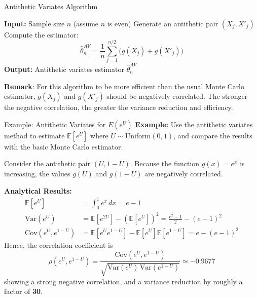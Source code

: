 \documentclass[8pt]{beamer}
\begin{document}
\begin{frame}{Antithetic Variates Algorithm}
\begin{algorithm}[H]
\caption{Monte Carlo with Antithetic Variates}\label{alg:antithetic-variates}
\begin{algorithmic}[1]
  \State \textbf{Input:} Sample size $n$ (assume $n$ is even)
    \State Generate an antithetic pair $(X_j, X'_j)$
  \EndFor
  \State Compute the estimator:
  \[
  \hat{\theta}_n^{AV} = \frac{1}{n} \sum_{j=1}^{n/2} \bigl(g(X_j) + g(X'_j)\bigr)
  \]
  \State \textbf{Output:} Antithetic variates estimator $\hat{\theta}_n^{AV}$
\end{algorithmic}
\end{algorithm}

\vspace{2mm}
\textbf{Remark}: For this algorithm to be more efficient than the usual Monte Carlo estimator,  
$g(X_j)$ and $g(X'_j)$ should be \alert{negatively correlated}. The stronger the negative correlation, the greater the variance reduction and efficiency.
\end{frame}

\begin{frame}{Example: Antithetic Variates for $E(e^U)$}
\textbf{Example:} Use the antithetic variates method to estimate $\mathbb{E}[e^U]$ where $U \sim \text{Uniform}(0,1)$, and compare the results with the basic Monte Carlo estimator.

Consider the antithetic pair $(U, 1-U)$. Because the function $g(x) = e^x$ is \alert{increasing}, the values $g(U)$ and $g(1-U)$ are \alert{negatively correlated}.

\vspace{1mm}

\textbf{Analytical Results:}
\begin{align*}
  \mathbb{E}[e^U] &= \int_0^1 e^x \, dx = e - 1 \\
  \mathrm{Var}(e^U) &= \mathbb{E}[e^{2U}] - (\mathbb{E}[e^U])^2 = \frac{e^2 - 1}{2} - (e - 1)^2 \\
  \mathrm{Cov}(e^U, e^{1-U}) &= \mathbb{E}[e^U e^{1-U}] - \mathbb{E}[e^U]\mathbb{E}[e^{1-U}] = e - (e - 1)^2
\end{align*}
Hence, the correlation coefficient is
\begin{equation*}
	\rho(e^U, e^{1-U}) = \frac{\mathrm{Cov}(e^U, e^{1-U})}{\sqrt{\mathrm{Var}(e^U)\,\mathrm{Var}(e^{1-U})}} \simeq -0.9677
\end{equation*}
showing a strong negative correlation, 
and a variance reduction by roughly a factor of \textbf{30}.
\end{frame}
\end{document}
